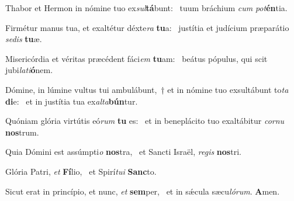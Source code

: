 \item Thabor et Hermon in nómine tuo ex\textit{sul}\textbf{tá}bunt:~\psstar{} tuum bráchium \textit{cum} \textit{pot}\textbf{én}tia.

\item Firmétur manus tua, et exaltétur déxte\textit{ra} \textbf{tu}a:~\psstar{} justítia et judícium præparátio \textit{sedis} \textbf{tu}æ.

\item Misericórdia et véritas præcédent fáci\textit{em} \textbf{tu}am:~\psstar{} beátus pópulus, qui scit jubi\textit{lati}\textbf{ó}nem.

\item Dómine, in lúmine vultus tui ambulábunt,~† et in nómine tuo exsultábunt to\textit{ta} \textbf{di}e:~\psstar{} et in justítia tua ex\textit{alta}\textbf{bún}tur.

\item Quóniam glória virtútis eó\textit{rum} \textbf{tu} es:~\psstar{} et in beneplácito tuo exaltábitur \textit{cornu} \textbf{nos}trum.

\item Quia Dómini est assúmpti\textit{o} \textbf{nos}tra,~\psstar{} et Sancti Israël, \textit{regis} \textbf{nos}tri.

\item Glória Patri, \textit{et} \textbf{Fí}lio,~\psstar{} et Spirí\textit{tui} \textbf{Sanc}to.

\item Sicut erat in princípio, et nunc, \textit{et} \textbf{sem}per,~\psstar{} et in sǽcula sæcu\textit{lórum}. \textbf{A}men.
